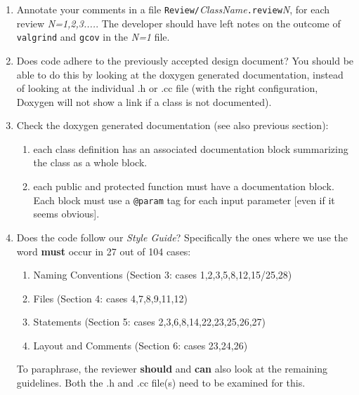 \documentclass{article}
\begin{document}
\begin{enumerate}
\item
  Annotate your 
  comments in a file {\tt Review/}{\it ClassName}{\tt .review}{\it N}, for each
  review {\it N=1,2,3....}. The developer should have left notes on the outcome
  of {\tt valgrind} and {\tt gcov} in the {\it N=1} file.

\item
 Does code adhere to the previously accepted design document?
You should be able to do this by looking at the doxygen generated documentation,
instead of looking at the individual .h or .cc file
(with the right configuration, Doxygen will not show a
link if a class is not documented).

\item
  Check the doxygen generated documentation (see also previous section):
  \begin{enumerate}
  \item
    each class definition has an associated documentation
    block summarizing the class as a whole block.  
  \item
    each public and protected function must have a documentation
    block.  Each block must use a {\tt @param} tag for each input parameter
    [even if it seems obvious].
  \end{enumerate}
\item
  Does the code follow our {\it Style Guide}? Specifically 
  the ones where we use the word {\bf must} occur in 27 out of 104 
  cases:
  \begin{enumerate}
  \item
    Naming Conventions  (Section 3: cases 1,2,3,5,8,12,15/25,28)
  \item
    Files (Section 4: cases 4,7,8,9,11,12)
  \item
    Statements (Section 5: cases 2,3,6,8,14,22,23,25,26,27)
  \item
    Layout and Comments (Section 6: cases 23,24,26)
  \end{enumerate}
  To paraphrase, the reviewer {\bf should} and {\bf can} also look 
  at the remaining guidelines. Both the .h and .cc file(s) need to
  be examined for this.





\end{enumerate}
\end{document}
